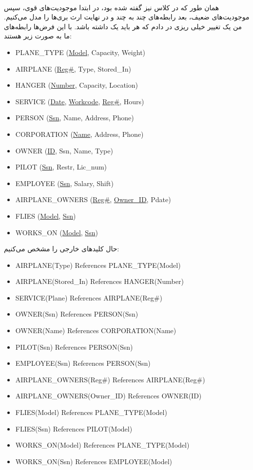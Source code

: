 \\
همان طور که در کلاس نیز گفته شده بود، در ابتدا موجودیت‌های قوی، سپس موجودیت‌های ضعیف، بعد رابطه‌های چند به چند
و در نهایت ارث بری‌ها را مدل می‌کنیم. من یک تغییر خیلی ریزی در
دادم که هر
باید یک
داشته باشد. با این فرض‌ها رابطه‌های ما به صورت زیر هستند:
\begin{latin}
\begin{itemize}
    \item PLANE\_TYPE (\underline{Model}, Capacity, Weight)
    \item AIRPLANE (\underline{Reg\#}, Type, Stored\_In)
    \item HANGER (\underline{Number}, Capacity, Location)
    \item SERVICE (\underline{Date}, \underline{Workcode}, \underline{Reg\#}, Hours)
    \item PERSON (\underline{Ssn}, Name, Address, Phone)
    \item CORPORATION (\underline{Name}, Address, Phone)
    \item OWNER (\underline{ID}, Ssn, Name, Type)
    \item PILOT (\underline{Ssn}, Restr, Lic\_num)
    \item EMPLOYEE (\underline{Ssn}, Salary, Shift)
    \item AIRPLANE\_OWNERS (\underline{Reg\#}, \underline{Owner\_ID}, Pdate)
    \item FLIES (\underline{Model}, \underline{Ssn})
    \item WORKS\_ON (\underline{Model}, \underline{Ssn})
\end{itemize}
\end{latin}
\noindent
حال کلید‌های خارجی را مشخص می‌کنیم:
\begin{latin}
\begin{itemize}
    \item AIRPLANE(Type) References PLANE\_TYPE(Model)
    \item AIRPLANE(Stored\_In) References HANGER(Number)
    \item SERVICE(Plane) References AIRPLANE(Reg\#)
    \item OWNER(Ssn) References PERSON(Ssn)
    \item OWNER(Name) References CORPORATION(Name)
    \item PILOT(Ssn) References PERSON(Ssn)
    \item EMPLOYEE(Ssn) References PERSON(Ssn)
    \item AIRPLANE\_OWNERS(Reg\#) References AIRPLANE(Reg\#)
    \item AIRPLANE\_OWNERS(Owner\_ID) References OWNER(ID)
    \item FLIES(Model) References PLANE\_TYPE(Model)
    \item FLIES(Ssn) References PILOT(Model)
    \item WORKS\_ON(Model) References PLANE\_TYPE(Model)
    \item WORKS\_ON(Ssn) References EMPLOYEE(Model)
\end{itemize}
\end{latin}
